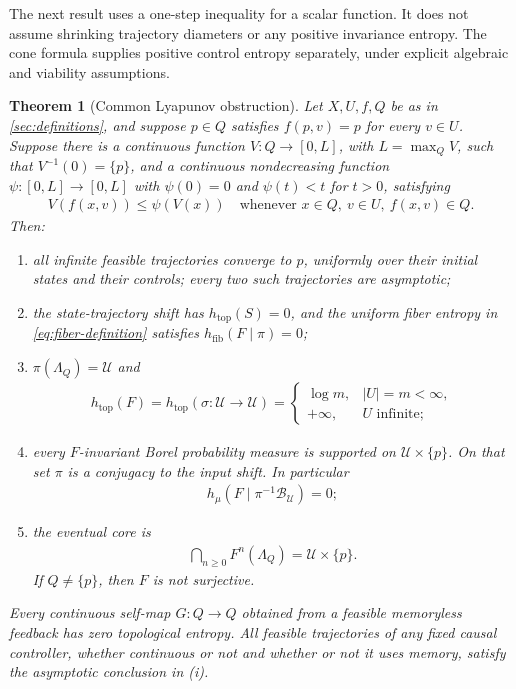 \documentclass[11pt,a4paper]{article}
\newtheorem{theorem}{Theorem}[section]
\theoremstyle{definition}
\theoremstyle{remark}
\begin{document}
The next result uses a one-step inequality for a scalar function. It does not assume shrinking trajectory diameters or any positive invariance entropy. The cone formula supplies positive control entropy separately, under explicit algebraic and viability assumptions.

\begin{theorem}[Common Lyapunov obstruction]\label{thm:lyapunov}
Let \(X,U,f,Q\) be as in \cref{sec:definitions}, and suppose \(p\in Q\) satisfies \(f(p,v)=p\) for every \(v\in U\). Suppose there is a continuous function \(V:Q\to[0,L]\), with \(L=\max_QV\), such that \(V^{-1}(0)=\{p\}\), and a continuous nondecreasing function \(\psi:[0,L]\to[0,L]\) with \(\psi(0)=0\) and \(\psi(t)<t\) for \(t>0\), satisfying
\begin{align}\label{eq:lyapunov}
 V(f(x,v))\leq\psi(V(x))
 \quad\text{whenever }x\in Q,\ v\in U,\ f(x,v)\in Q.
\end{align}
Then:
\begin{enumerate}
\item all infinite feasible trajectories converge to \(p\), uniformly over their initial states and their controls; every two such trajectories are asymptotic;
\item the state-trajectory shift has \(h_{\mathrm{top}}(S)=0\), and the uniform fiber entropy in \eqref{eq:fiber-definition} satisfies \(h_{\mathrm{fib}}(F\mid\pi)=0\);
\item \(\pi(\Lambda_Q)=\mathcal U\) and
\begin{align*}
 h_{\mathrm{top}}(F)=h_{\mathrm{top}}(\sigma:\mathcal U\to\mathcal U)
 =\begin{cases}\log m,&|U|=m<\infty,\\+\infty,&U\text{ infinite};\end{cases}
\end{align*}
\item every \(F\)-invariant Borel probability measure is supported on \(\mathcal U\times\{p\}\). On that set \(\pi\) is a conjugacy to the input shift. In particular
\begin{align*}
 h_\mu(F\mid\pi^{-1}\mathcal B_{\mathcal U})=0;
\end{align*}
\item the eventual core is
\begin{align*}
 \bigcap_{n\geq0}F^n(\Lambda_Q)=\mathcal U\times\{p\}.
\end{align*}
If \(Q\ne\{p\}\), then \(F\) is not surjective.
\end{enumerate}
Every continuous self-map \(G:Q\to Q\) obtained from a feasible memoryless feedback has zero topological entropy. All feasible trajectories of any fixed causal controller, whether continuous or not and whether or not it uses memory, satisfy the asymptotic conclusion in (i).
\end{theorem}
\end{document}
